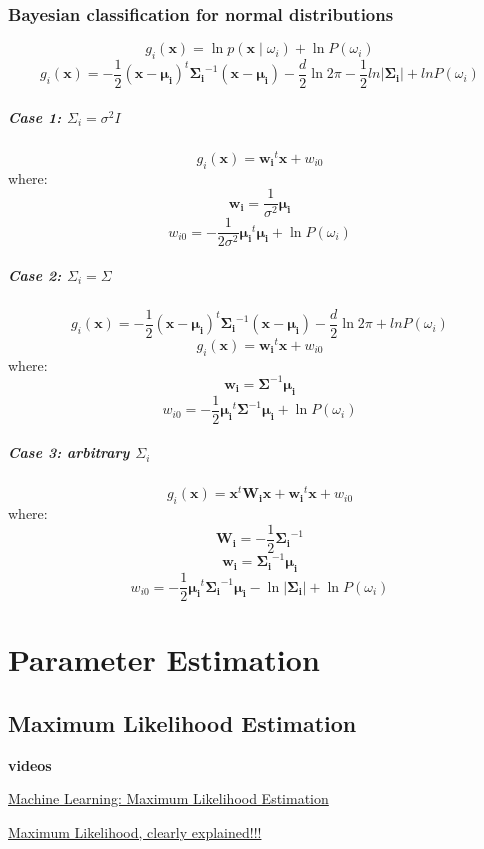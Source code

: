 \documentclass{report}
\begin{document}
\subsection*{Bayesian classification for normal distributions}
\[g_i(\symbf{x}) = \ln p(\symbf{x} \mid \omega_i) + \ln P(\omega_i)\]
\[g_i(\symbf{x}) = -\frac{1}{2} (\symbf{x} - \symbf{\mu_i})^t \symbf{\Sigma_i}^{-1} (\symbf{x} - \symbf{\mu_i}) - \frac{d}{2}\ln2\pi - \frac{1}{2} ln |\symbf{\Sigma_i}| + ln P(\omega_i)\]
\paragraph*{Case 1: $\Sigma_i = \sigma^2 I$}
\[g_i(\symbf{x}) = \symbf{w_i}^t \symbf{x} + w_{i0}\]
where:
\[\symbf{w_i} = \frac{1}{\sigma^{2}} \symbf{\mu_i}\]
\[w_{i0} = -\frac{1}{2\sigma^2}\symbf{\mu_i}^t \symbf{\mu_i} + \ln P(\omega_i) \]

\paragraph*{Case 2: $\Sigma_i = \Sigma$}
\[g_i(\symbf{x}) = -\frac{1}{2} (\symbf{x} - \symbf{\mu_i})^t \symbf{\Sigma_i}^{-1} (\symbf{x} - \symbf{\mu_i}) - \frac{d}{2}\ln2\pi + ln P(\omega_i)\]
\[g_i(\symbf{x}) = \symbf{w_i}^t \symbf{x} + w_{i0}\]
where:
\[\symbf{w_i} = \symbf{\Sigma}^{-1} \symbf{\mu_i}\]
\[w_{i0} = -\frac{1}{2}\symbf{\mu_i}^t \symbf{\Sigma}^{-1} \symbf{\mu_i} + \ln P(\omega_i) \]

\paragraph*{Case 3: arbitrary $\Sigma_i$}
\[g_i(\symbf{x}) = \symbf{x}^t \symbf{W_i} \symbf{x} + \symbf{w_i}^t \symbf{x} + w_{i0}\]
where:
\[\symbf{W_i} = -\frac{1}{2}\symbf{\Sigma_i}^{-1}\]
\[\symbf{w_i} = \symbf{\Sigma_i}^{-1} \symbf{\mu_i}\]
\[w_{i0} = -\frac{1}{2}\symbf{\mu_i}^t \symbf{\Sigma_i}^{-1} \symbf{\mu_i} - \ln |\symbf{\Sigma_i}| + \ln P(\omega_i) \]


\chapter{Parameter Estimation}

\section{Maximum Likelihood Estimation}
\begin{mdframed}
	\textbf{videos}

	\href{https://www.youtube.com/watch?v=sguol03tfWo&list=PL5yR0euE9N2kGEf7gqysMFq0Spoq0evNf&index=2}{Machine Learning: Maximum Likelihood Estimation}

	\href{https://www.youtube.com/watch?v=XepXtl9YKwc}{Maximum Likelihood, clearly explained!!!}
\end{mdframed}
\end{document}

